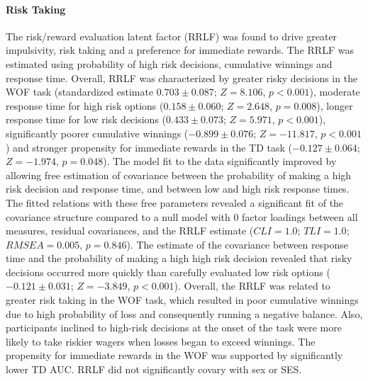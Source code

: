 \documentclass[utf8]{frontiersSCNS} %
\begin{document}
\paragraph{Risk Taking} The risk/reward evaluation latent factor (RRLF) was found to drive greater impulsivity, risk taking and a preference for immediate rewards. The RRLF was estimated using probability of high risk decisions, cumulative winnings and response time. Overall, RRLF was characterized by greater risky decisions in the WOF task (standardized estimate $0.703\pm0.087$; $Z=8.106$, $p<0.001$), moderate response time for high risk options ($0.158\pm0.060$; $Z=2.648$, $p=0.008$), longer response time for low risk decisions ($0.433\pm0.073$; $Z=5.971$, $p<0.001$), significantly poorer cumulative winnings ($-0.899\pm0.076$; $Z=-11.817$, $p<0.001$) and stronger propensity for immediate rewards in the TD task ($-0.127\pm0.064$; $Z=-1.974$, $p=0.048$). The model fit to the data significantly improved by allowing free estimation of covariance between the probability of making a high risk decision and response time, and between low and high risk response times. The fitted relations with these free parameters revealed a significant fit of the covariance structure compared to a null model with 0 factor loadings between all measures, residual covariances, and the RRLF estimate ($CLI = 1.0$; $TLI = 1.0$; $RMSEA = 0.005$, $p = 0.846$). The estimate of the covariance between response time and the probability of making a high high risk decision revealed that risky decisions occurred more quickly than carefully evaluated low risk options ($-0.121\pm0.031$; $Z=-3.849$, $p<0.001$). Overall, the RRLF was related to greater risk taking in the WOF task, which resulted in poor cumulative winnings due to high probability of loss and consequently running a negative balance. Also, participants inclined to high-risk decisions at the onset of the task were more likely to take riskier wagers when losses began to exceed winnings. The propensity for immediate rewards in the WOF was supported by significantly lower TD AUC. RRLF did not significantly covary with sex or SES.
\end{document}
